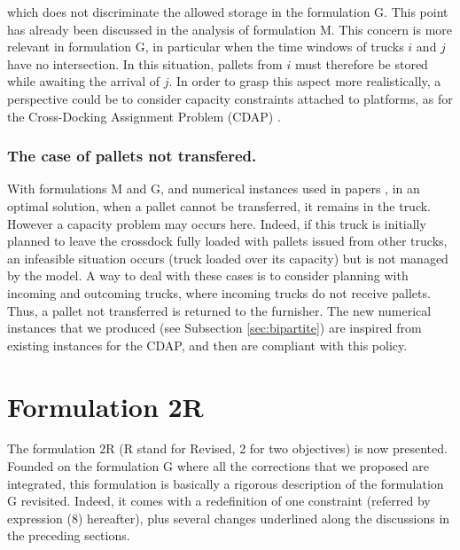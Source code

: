\documentclass[preprint,12pt,authoryear]{elsarticle}
\begin{document}
\bigskip
\noindent
which does not discriminate the allowed storage in the formulation G.
%  
This point has already been discussed in the analysis of formulation M.
This concern is more relevant in formulation G, in particular when the time windows of trucks $i$ and $j$ have no intersection. In this situation, pallets from $i$ must therefore be stored while awaiting the arrival of $j$.
    In order to grasp this aspect more realistically, a perspective could be to consider capacity constraints attached to platforms, as for the Cross-Docking Assignment Problem (CDAP) \citep{Zhu2009} .      

%
%
\subsubsection{The case of pallets not transfered.}\label{sec:palletnotTransferred}

With formulations M and G, and numerical instances used in papers \cite{GELAREH2016,MIAO2009},  in an optimal solution, when a pallet cannot be transferred, it remains in the truck. However a capacity problem may occurs here. Indeed, if this truck is initially planned to leave the crossdock fully loaded with pallets issued from other trucks, an infeasible situation occurs (truck loaded over its capacity) but is not managed by the model. 
%
A way to deal with these cases is to consider planning with incoming and outcoming trucks, where incoming trucks do not receive pallets. Thus, a pallet not transferred is returned to the furnisher. The new numerical instances that we produced (see Subsection \ref{sec:bipartite}) are inspired from existing instances for the CDAP, and then are compliant with this policy.
   


%
%
\section{Formulation 2R}\label{sec:Formulation2R}

The formulation 2R (R stand for Revised, 2 for two objectives) is now presented.
%
Founded on the formulation G where all the corrections that we proposed are integrated, this formulation is basically a rigorous description of the formulation G  revisited. Indeed, it comes with a redefinition of one constraint (referred by expression (8) hereafter), plus several changes underlined along the discussions in the preceding sections.
\end{document}
